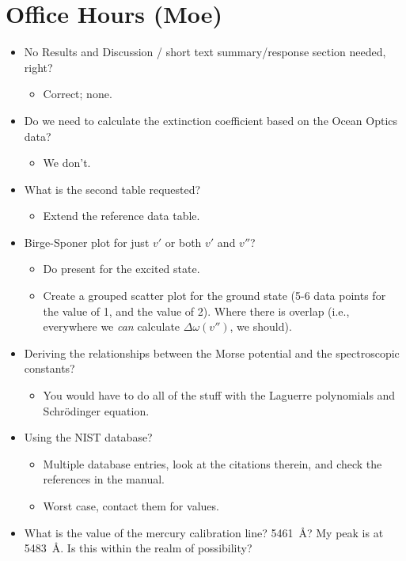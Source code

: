 \documentclass[../notes.tex]{subfiles}
\begin{document}
\section{Office Hours (Moe)}
\begin{itemize}
    \item No Results and Discussion / short text summary/response section needed, right?
    \begin{itemize}
        \item Correct; none.
    \end{itemize}
    \item Do we need to calculate the extinction coefficient based on the Ocean Optics data?
    \begin{itemize}
        \item We don't.
    \end{itemize}
    \item What is the second table requested?
    \begin{itemize}
        \item Extend the reference data table.
    \end{itemize}
    \item Birge-Sponer plot for just $v'$ or both $v'$ and $v''$?
    \begin{itemize}
        \item Do present for the excited state.
        \item Create a grouped scatter plot for the ground state (5-6 data points for the value of 1, and the value of 2). Where there is overlap (i.e., everywhere we \emph{can} calculate $\Delta\omega(v'')$, we should).
    \end{itemize}
    \item Deriving the relationships between the Morse potential and the spectroscopic constants?
    \begin{itemize}
        \item You would have to do all of the stuff with the Laguerre polynomials and Schr\"{o}dinger equation.
    \end{itemize}
    \item Using the NIST database?
    \begin{itemize}
        \item Multiple database entries, look at the citations therein, and check the references in the manual.
        \item Worst case, contact them for values.
    \end{itemize}
    \item What is the value of the mercury calibration line? \SI{5461}{\angstrom}? My peak is at \SI{5483}{\angstrom}. Is this within the realm of possibility?

\end{itemize}
\end{document}
